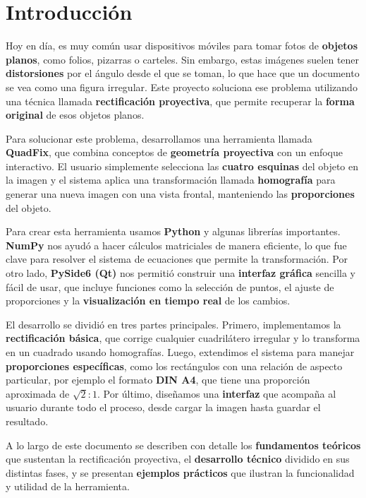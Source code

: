 
\chapter{Introducción}
\label{ch:introduccion}
Hoy en día, es muy común usar dispositivos móviles para tomar fotos de \textbf{objetos planos}, como folios, pizarras o carteles. Sin embargo, estas imágenes suelen tener \textbf{distorsiones} por el ángulo desde el que se toman, lo que hace que un documento se vea como una figura irregular. Este proyecto soluciona ese problema utilizando una técnica llamada \textbf{rectificación proyectiva}, que permite recuperar la \textbf{forma original} de esos objetos planos.

Para solucionar este problema, desarrollamos una herramienta llamada \textbf{QuadFix}, que combina conceptos de \textbf{geometría proyectiva} con un enfoque interactivo. El usuario simplemente selecciona las \textbf{cuatro esquinas} del objeto en la imagen y el sistema aplica una transformación llamada \textbf{homografía} para generar una nueva imagen con una vista frontal, manteniendo las \textbf{proporciones} del objeto. 

Para crear esta herramienta usamos \textbf{Python} y algunas librerías importantes. \textbf{NumPy} nos ayudó a hacer cálculos matriciales de manera eficiente, lo que fue clave para resolver el sistema de ecuaciones que permite la transformación. Por otro lado, \textbf{PySide6 (Qt)} nos permitió construir una \textbf{interfaz gráfica} sencilla y fácil de usar, que incluye funciones como la selección de puntos, el ajuste de proporciones y la \textbf{visualización en tiempo real} de los cambios.

El desarrollo se dividió en tres partes principales. Primero, implementamos la \textbf{rectificación básica}, que corrige cualquier cuadrilátero irregular y lo transforma en un cuadrado usando homografías. Luego, extendimos el sistema para manejar \textbf{proporciones específicas}, como los rectángulos con una relación de aspecto particular, por ejemplo el formato \textbf{DIN A4}, que tiene una proporción aproximada de \(\sqrt{2}:1\). Por último, diseñamos una \textbf{interfaz} que acompaña al usuario durante todo el proceso, desde cargar la imagen hasta guardar el resultado.

A lo largo de este documento se describen con detalle los \textbf{fundamentos teóricos} que sustentan la rectificación proyectiva, el \textbf{desarrollo técnico} dividido en sus distintas fases, y se presentan \textbf{ejemplos prácticos} que ilustran la funcionalidad y utilidad de la herramienta.

